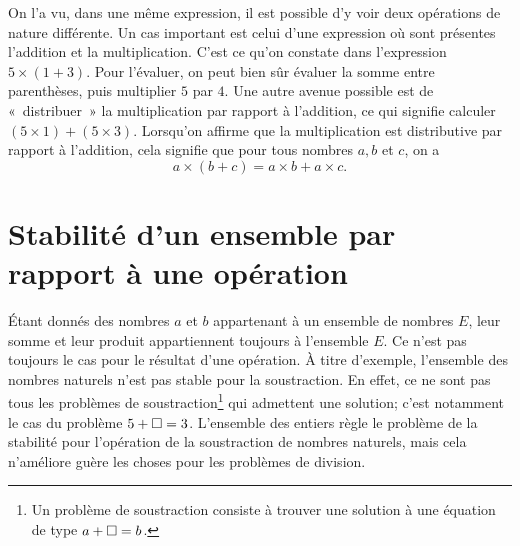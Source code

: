 \documentclass[
  letterpaper,
  DIV=11,
  numbers=noendperiod,
  oneside]{scrreprt}
\theoremstyle{definition}
\theoremstyle{remark}
\begin{document}
On l'a vu, dans une même expression, il est possible d'y voir deux
opérations de nature différente. Un cas important est celui d'une
expression où sont présentes l'addition et la multiplication. C'est ce
qu'on constate dans l'expression \(5\times(1+3)\). Pour l'évaluer, on
peut bien sûr évaluer la somme entre parenthèses, puis multiplier \(5\)
par \(4\). Une autre avenue possible est de «~distribuer~» la
multiplication par rapport à l'addition, ce qui signifie calculer
\((5\times 1)+(5\times 3)\). Lorsqu'on affirme que la multiplication est
distributive par rapport à l'addition, cela signifie que pour tous
nombres \(a,b\) et \(c\), on a \[a\times (b+c)=a\times b+a\times c.\]

\hypertarget{stabilituxe9-dun-ensemble-par-rapport-uxe0-une-opuxe9ration}{%
\section{Stabilité d'un ensemble par rapport à une
opération}\label{stabilituxe9-dun-ensemble-par-rapport-uxe0-une-opuxe9ration}}


Étant donnés des nombres \(a\) et \(b\) appartenant à un ensemble de
nombres \(E\), leur somme et leur produit appartiennent toujours à
l'ensemble \(E\). Ce n'est pas toujours le cas pour le résultat d'une
opération. À titre d'exemple, l'ensemble des nombres naturels n'est pas
stable pour la soustraction. En effet, ce ne sont pas tous les problèmes
de soustraction\footnote{Un problème de soustraction consiste à trouver
  une solution à une équation de type \(a+\square=b\).} qui admettent
une solution; c'est notamment le cas du problème \(5+\square=3\).
L'ensemble des entiers règle le problème de la stabilité pour
l'opération de la soustraction de nombres naturels, mais cela n'améliore
guère les choses pour les problèmes de division.
\end{document}
